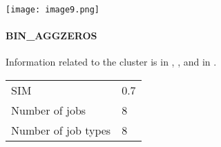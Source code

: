 \documentclass{jhps}
\begin{document}
\begingroup
  \centering
  \texttt{[image: image9.png]}
  \label{fig:use_case:bin_all:length}
\endgroup

\paragraph{BIN\_AGGZEROS}
Information related to the cluster is in , , and in .

\begingroup
  \centering
  \begin{tabular}{ll}
    SIM & 0.7 \\
    Number of jobs & 8 \\
    Number of job types & 8 \\
  \end{tabular}
  \label{tab:use_case:bin_aggzeros:stats}
\endgroup
\end{document}
